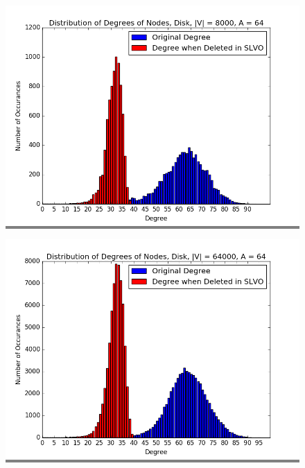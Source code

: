 \documentclass{article}
\begin{document}
\begin{figure}
    \begin{minipage}{0.45\textwidth}
    \colorbox{gray}{\includegraphics[width=\linewidth]{./graphs/hist_deg_del_disk_0.png}}
    \end{minipage}
    \hspace{\fill}
    \begin{minipage}{0.45\textwidth}
    \colorbox{gray}{\includegraphics[width=\linewidth]{./graphs/hist_deg_del_disk_1.png}}
    \end{minipage}
    \vskip 0.25in
    \begin{minipage}{0.45\textwidth}

\end{minipage}
\end{figure}
\end{document}
